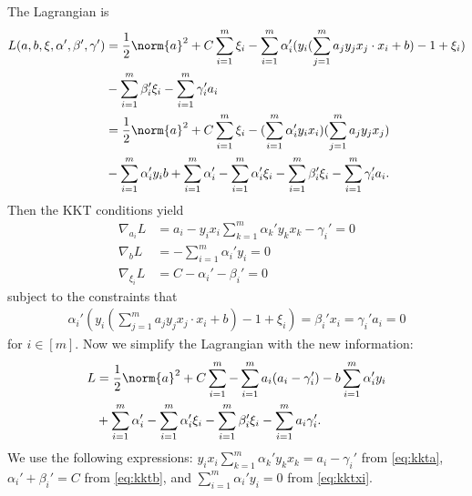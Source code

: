 \begin{enumerate}
\begin{enumerate}
        The Lagrangian is
        \begin{align}
            L(a, b, \xi, \alpha', \beta', \gamma')
            &= \frac{1}{2}{\norm{a}^2} + C \sum_{i=1}^m\xi_i
            - \sum_{i=1}^m\alpha_i'(y_i(\sum_{j=1}^m a_j y_j x_j
            \cdot x_i + b)-1 + \xi_i) \nonumber \\
            &- \sum_{i=1}^m\beta_i'\xi_i - \sum_{i=1}^m\gamma_i'a_i
            \nonumber \\
            &= \frac{1}{2}{\norm{a}^2} + C \sum_{i=1}^m\xi_i
            - (\sum_{i=1}^m\alpha_i'y_i x_i)
            (\sum_{j=1}^m a_j y_j x_j) \nonumber \\
            &- \sum_{i=1}^m\alpha_i'y_i b + \sum_{i=1}^m\alpha_i'
            - \sum_{i=1}^m\alpha_i'\xi_i
            - \sum_{i=1}^m\beta_i'\xi_i - \sum_{i=1}^m\gamma_i'a_i.
            \nonumber
        \end{align}
        Then the KKT conditions yield
        \begin{align}
            \nabla_{a_i}L &= a_i - y_i x_i \sum_{k=1}^m
            \alpha_k'y_k x_k - \gamma_i' = 0
            \label{eq:kkta} \\
            \nabla_{b}L &= -\sum_{i=1}^m\alpha_i' y_i = 0
            \label{eq:kktb} \\
            \nabla_{\xi_i}L &= C - \alpha_i' - \beta_i' = 0
            \label{eq:kktxi}
        \end{align}
        subject to the constraints that
        \begin{align}
            \alpha_i'(y_i(\sum_{j=1}^m a_j y_j x_j\cdot x_i
            + b) -1 +\xi_i) 
            =\beta_i'x_i
            =\gamma_i'a_i=0
            \nonumber
        \end{align}
        for $i \in [m]$.
        Now we simplify the Lagrangian with the
        new information:
        \begin{align}
            L &= \frac{1}{2}\norm{a}^2 + C\sum_{i=1}^m
            - \sum_{i=1}^m a_i(a_i-\gamma_i')
            - b\sum_{i=1}^m\alpha_i'y_i \nonumber \\
            &+ \sum_{i=1}^m\alpha_i' -\sum_{i=1}^m \alpha_i' \xi_i
            - \sum_{i=1}^m\beta_i' \xi_i - \sum_{i=1}^m a_i \gamma_i'.
            \nonumber
        \end{align}
        We use the following expressions:
        $y_i x_i \sum_{k=1}^m \alpha_k'y_k x_k = a_i -\gamma_i'$
        from \autoref{eq:kkta},
        $\alpha_i'+\beta_i'=C$ from \autoref{eq:kktb}, and
        $\sum_{i=1}^m \alpha_i'y_i=0$ from \autoref{eq:kktxi}.

\end{enumerate}
\end{enumerate}

